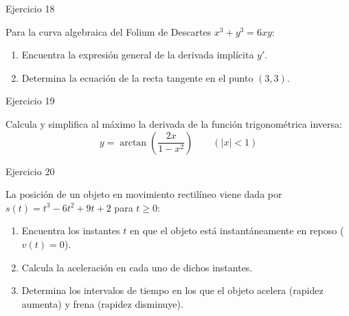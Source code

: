 \documentclass[aspectratio=169]{beamer}
\begin{document}
\begin{frame}{Ejercicio 18}
  \begin{mwejercicio}
    Para la curva algebraica del Folium de Descartes $x^3 + y^3 = 6xy$:
    \begin{enumerate}
      \item Encuentra la expresión general de la derivada implícita $y'$.
      \item Determina la ecuación de la recta tangente en el punto $(3, 3)$.
    \end{enumerate}
  \end{mwejercicio}
  \vspace{3.5cm}
\end{frame}
\begin{frame}{Ejercicio 19}
  \begin{mwejercicio}
    Calcula y simplifica al máximo la derivada de la función trigonométrica inversa:
    $$y = \arctan\left(\frac{2x}{1 - x^2}\right) \qquad (|x| < 1)$$
  \end{mwejercicio}
  \vspace{3.5cm}
\end{frame}
\begin{frame}{Ejercicio 20}
  \begin{mwejercicio}
    La posición de un objeto en movimiento rectilíneo viene dada por $s(t) = t^3 - 6t^2 + 9t + 2$ para $t \ge 0$:
    \begin{enumerate}
      \item Encuentra los instantes $t$ en que el objeto está instantáneamente en reposo ($v(t) = 0$).
      \item Calcula la aceleración en cada uno de dichos instantes.
      \item Determina los intervalos de tiempo en los que el objeto acelera (rapidez aumenta) y frena (rapidez disminuye).
    \end{enumerate}
  \end{mwejercicio}
  \vspace{2.5cm}
\end{frame}
\end{document}
